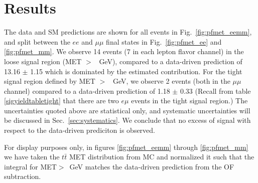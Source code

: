 
\section{Results}
\label{sec:results}

The data and SM predictions are shown for all events in 
Fig.~\ref{fig:pfmet_eemm}, 
and split between the $ee$
and $\mu\mu$ final states in 
Fig.~\ref{fig:pfmet_ee} and \ref{fig:pfmet_mm}. 
We observe 14 events (7 in each lepton flavor channel) 
in the loose signal region (MET $>$ \signalmetl~GeV), 
compared to a data-driven prediction of 
13.16  $\pm$  1.15
which is dominated by the estimated \ttbar contribution. 
For the tight signal region defined by MET $>$ \signalmett~GeV, 
we observe 2 events (both in the $\mu\mu$ channel) compared to a 
data-driven prediction of 
1.18  $\pm$  0.33
(Recall from table \ref{sigyieldtabletight} that there are two $e\mu$ events in 
the tight signal region.)
The uncertainties quoted above are statistical only, and systematic uncertainties will be 
discussed in Sec.~\ref{sec:systematics}. We conclude that no excess of signal 
with respect to the data-driven prediciton is observed.

For display purposes only, in figures \ref{fig:pfmet_eemm} through \ref{fig:pfmet_mm} we have 
taken the
$t\bar{t}$ MET distribution from MC and normalized it such that the integral for 
MET$>$\signalmetl~GeV matches the data-driven prediction
from the OF subtraction. 



\newcommand{\resulttitle}
{                        &   MET $>30$  GeV    &   MET $>60$  GeV    &   MET $>100$ GeV    &   MET $>200$ GeV \\}

